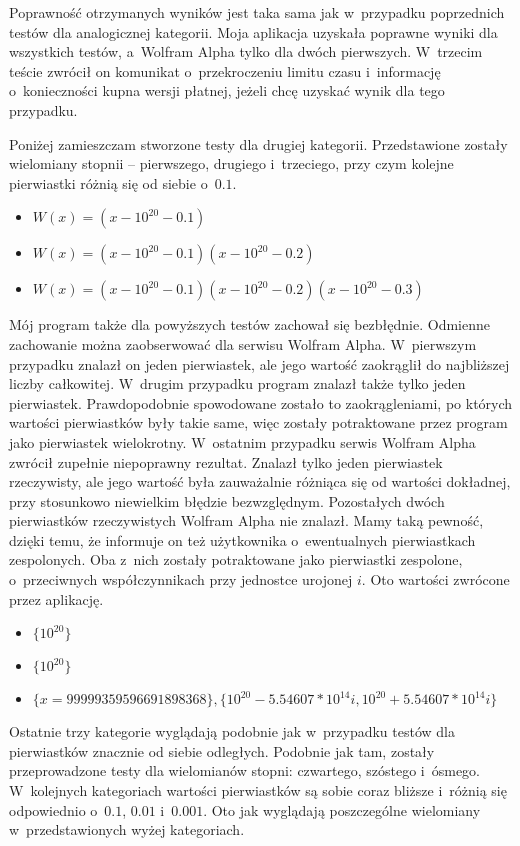 Poprawność otrzymanych wyników jest taka sama jak w~przypadku poprzednich testów dla analogicznej kategorii. Moja aplikacja uzyskała poprawne wyniki dla wszystkich testów, a~Wolfram Alpha tylko dla dwóch pierwszych. W~trzecim teście zwrócił on komunikat o~przekroczeniu limitu czasu i~informację o~konieczności kupna wersji płatnej, jeżeli chcę uzyskać wynik dla tego przypadku.

Poniżej zamieszczam stworzone testy dla drugiej kategorii. Przedstawione zostały wielomiany stopnii -- pierwszego, drugiego i~trzeciego, przy czym kolejne pierwiastki różnią się od siebie o~$0.1$.
\begin{itemize}
	\item $W(x)=(x-10^{20}-0.1)$
	\item $W(x)=(x-10^{20}-0.1)(x-10^{20}-0.2)$
	\item $W(x)=(x-10^{20}-0.1)(x-10^{20}-0.2)(x-10^{20}-0.3)$
\end{itemize}

Mój program także dla powyższych testów zachował się bezbłędnie. Odmienne zachowanie można zaobserwować dla serwisu Wolfram Alpha. W~pierwszym przypadku znalazł on jeden pierwiastek, ale jego wartość zaokrąglił do najbliższej liczby całkowitej. W~drugim przypadku program znalazł także tylko jeden pierwiastek. Prawdopodobnie spowodowane zostało to zaokrągleniami, po których wartości pierwiastków były takie same, więc zostały potraktowane przez program jako pierwiastek wielokrotny. W~ostatnim przypadku serwis Wolfram Alpha zwrócił zupełnie niepoprawny rezultat. Znalazł tylko jeden pierwiastek rzeczywisty, ale jego wartość była zauważalnie różniąca się od wartości dokładnej, przy stosunkowo niewielkim błędzie bezwzględnym. Pozostałych dwóch pierwiastków rzeczywistych Wolfram Alpha nie znalazł. Mamy taką pewność, dzięki temu, że informuje on też użytkownika o~ewentualnych pierwiastkach zespolonych. Oba z~nich zostały potraktowane jako pierwiastki zespolone, o~przeciwnych współczynnikach przy jednostce urojonej $i$. Oto wartości zwrócone przez aplikację.
\begin{itemize}
	\item $\{10^{20}\}$
	\item $\{10^{20}\}$
	\item $\{x = 99999359596691898368\}, \{10^{20}-5.54607*10^{14}i, 10^{20}+5.54607*10^{14}i\}$
\end{itemize}

Ostatnie trzy kategorie wyglądają podobnie jak w~przypadku testów dla pierwiastków znacznie od siebie odległych. Podobnie jak tam, zostały przeprowadzone testy dla wielomianów stopni: czwartego, szóstego i~ósmego. W~kolejnych kategoriach wartości pierwiastków są sobie coraz bliższe i~różnią się odpowiednio o~$0.1$, $0.01$ i~$0.001$. Oto jak wyglądają poszczególne wielomiany w~przedstawionych wyżej kategoriach.

